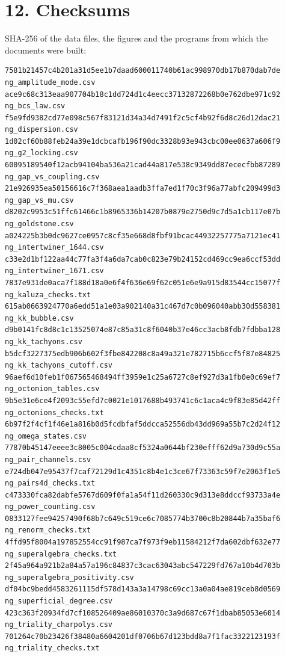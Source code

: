 \documentclass[
  10pt,
]{article}
\begin{document}
\hypertarget{checksums}{%
\section{12. Checksums}\label{checksums}}

SHA-256 of the data files, the figures and the programs from which the
documents were built:

\begin{verbatim}
7581b21457c4b201a31d5ee1b7daad600011740b61ac998970db17b870dab7de  ng_amplitude_mode.csv
ace9c68c313eaa907704b18c1dd724d1c4eecc37132872268b0e762dbe971c92  ng_bcs_law.csv
f5e9fd9382cd77e098c567f83121d34a34d7491f2c5cf4b92f6d8c26d12dac21  ng_dispersion.csv
1d02cf60b88feb24a39e1dcbcafb196f90dc3328b93e943cbc00ee0637a606f9  ng_g2_locking.csv
60095189540f12acb94104ba536a21cad44a817e538c9349dd87ececfbb87289  ng_gap_vs_coupling.csv
21e926935ea50156616c7f368aea1aadb3ffa7ed1f70c3f96a77abfc209499d3  ng_gap_vs_mu.csv
d8202c9953c51ffc61466c1b8965336b14207b0879e2750d9c7d5a1cb117e07b  ng_goldstone.csv
a024225b3b0dc9627ce0957c8cf35e668d8fbf91bcac44932257775a7121ec41  ng_intertwiner_1644.csv
c33e2d1bf122aa44c77fa3f4a6da7cab0c823e79b24152cd469cc9ea6ccf53dd  ng_intertwiner_1671.csv
7837e931de0aca7f188d18a0e6f4f636e69f62c051e6e9a915d83544cc15077f  ng_kaluza_checks.txt
615ab0663924770a6edd51a1e03a902140a31c467d7c0b096040abb30d558381  ng_kk_bubble.csv
d9b0141fc8d8c1c13525074e87c85a31c8f6040b37e46cc3acb8fdb7fdbba128  ng_kk_tachyons.csv
b5dcf3227375edb906b602f3fbe842208c8a49a321e782715b6ccf5f87e84825  ng_kk_tachyons_cutoff.csv
96aef6d10feb1f067565468494ff3959e1c25a6727c8ef927d3a1fb0e0c69ef7  ng_octonion_tables.csv
9b5e31e6ce4f2093c55efd7c0021e1017688b493741c6c1aca4c9f83e85d42ff  ng_octonions_checks.txt
6b97f2f4cf1f46e1a816b0d5fcdbfaf5ddcca52556db43dd969a55b7c2d24f12  ng_omega_states.csv
77870b45147eeee3c8005c004cdaa8cf5324a0644bf230efff62d9a730d9c55a  ng_pair_channels.csv
e724db047e95437f7caf72129d1c4351c8b4e1c3ce67f73363c59f7e2063f1e5  ng_pairs4d_checks.txt
c473330fca82dabfe5767d609f0fa1a54f11d260330c9d313e8ddccf93733a4e  ng_power_counting.csv
0833127fee94257490f68b7c649c519ce6c7085774b3700c8b20844b7a35baf6  ng_renorm_checks.txt
4ffd95f8004a197852554cc91f987ca7f973f9eb11584212f7da602dbf632e77  ng_superalgebra_checks.txt
2f45a964a921b2a84a57a196c84837c3cac63043abc547229fd767a10b4d703b  ng_superalgebra_positivity.csv
df04bc9bedd4583261115df578d143a3a14798c69cc13a0a04ae819ceb8d0569  ng_superficial_degree.csv
423c363f20934fd7cf108526409ae86010370c3a9d687c67f1dbab85053e6014  ng_triality_charpolys.csv
701264c70b23426f38480a6604201df0706b67d123bdd8a7f1fac3322123193f  ng_triality_checks.txt

\end{verbatim}
\end{document}
